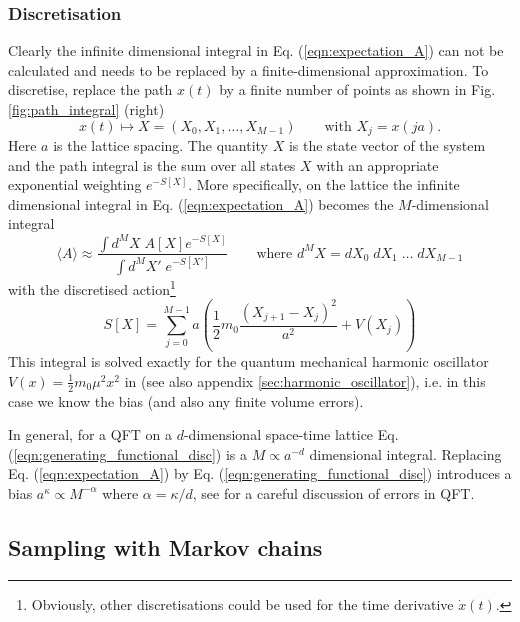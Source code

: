 \documentclass[11pt]{article}
\renewcommand{\vec}[1]{{#1}}
\begin{document}
\subsubsection{Discretisation}
Clearly the infinite dimensional integral in Eq. (\ref{eqn:expectation_A}) can not be calculated and needs to be replaced by a finite-dimensional approximation. To discretise, replace the path $x(t)$ by a finite number of points as shown in Fig. \ref{fig:path_integral} (right)
\begin{equation}
  x(t) \mapsto \vec{X} = (X_0,X_1,\dots,X_{M-1})\qquad\text{with $X_j=x(ja)$}.
\end{equation}
Here $a$ is the lattice spacing. The quantity $\vec{X}$ is the state vector of the system and the path integral is the sum over all states $X$ with an appropriate exponential weighting $e^{-S[X]}$.
More specifically, on the lattice the infinite dimensional integral in Eq. (\ref{eqn:expectation_A}) becomes the $M$-dimensional integral
\begin{equation}
  \langle A\rangle \approx \frac{\int d^M\vec{X} \;A[X]e^{-S[\vec{X}]}}{\int d^M\vec{X'} \;e^{-S[\vec{X'}]}}
  \qquad\text{where $d^M\vec{X}=dX_0\;dX_1\;\dots\;dX_{M-1}$}\label{eqn:generating_functional_disc}
\end{equation}
with the discretised action\footnote{Obviously, other discretisations could be used for the time derivative $\dot{x}(t)$.}
\begin{equation}
  S[\vec{X}] = \sum_{j=0}^{M-1} a \left(\frac{1}{2}m_0\frac{(X_{j+1}-X_j)^2}{a^2}+V(X_j)\right)\label{eqn:action_discrete}
\end{equation}
This integral is solved exactly for the quantum mechanical harmonic oscillator $V(x)=\frac{1}{2}m_0\mu^2 x^2$ in \cite{Creutz1981} (see also appendix \ref{sec:harmonic_oscillator}), i.e. in this case we know the bias (and also any finite volume errors).

In general, for a QFT on a $d$-dimensional space-time lattice Eq. (\ref{eqn:generating_functional_disc}) is a $M\propto a^{-d}$ dimensional integral. Replacing Eq. (\ref{eqn:expectation_A}) by Eq. (\ref{eqn:generating_functional_disc}) introduces a bias $a^{\kappa} \propto M^{-\alpha}$ where $\alpha=\kappa/d$, see \cite{Lepage1994} for a careful discussion of errors in QFT.
\subsection{Sampling with Markov chains}
\end{document}
